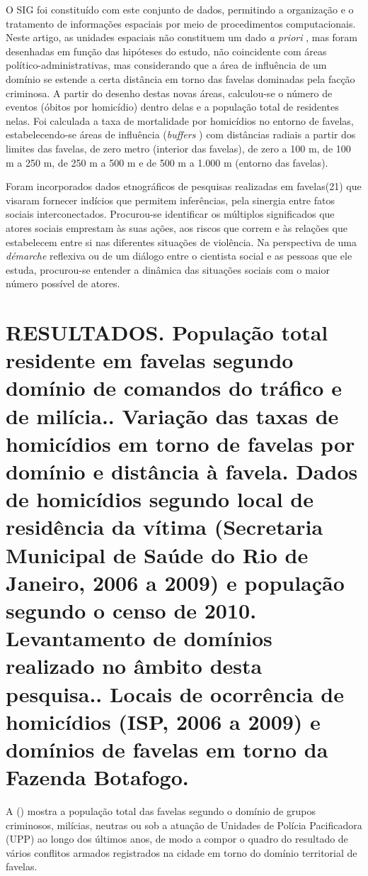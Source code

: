 \documentclass{article}
\begin{document}
O SIG foi constituído com este conjunto de dados, permitindo a organização e o
tratamento de informações espaciais por meio de procedimentos computacionais.
Neste artigo, as unidades espaciais não constituem um dado \textit{a priori}
, mas foram desenhadas em função das hipóteses do estudo, não coincidente com
áreas político-administrativas, mas considerando que a área de influência de um
domínio se estende a certa distância em torno das favelas dominadas pela facção
criminosa. A partir do desenho destas novas áreas, calculou-se o número de
eventos (óbitos por homicídio) dentro delas e a população total de residentes
nelas. Foi calculada a taxa de mortalidade por homicídios no entorno de favelas,
estabelecendo-se áreas de influência (\textit{buffers}
) com distâncias radiais a partir dos limites das favelas, de zero metro
(interior das favelas), de zero a 100 m, de 100 m a 250 m, de 250 m a 500 m e de
500 m a 1.000 m (entorno das favelas).

Foram incorporados dados etnográficos de pesquisas realizadas em favelas(21)
que visaram fornecer indícios que permitem inferências, pela sinergia entre
fatos sociais interconectados. Procurou-se identificar os múltiplos significados
que atores sociais emprestam às suas ações, aos riscos que correm e às relações
que estabelecem entre si nas diferentes situações de violência. Na perspectiva
de uma \textit{démarche}
reflexiva ou de um diálogo entre o cientista social e as pessoas que ele estuda,
procurou-se entender a dinâmica das situações sociais com o maior número
possível de atores.

\section{RESULTADOS. População total residente em favelas segundo domínio de
comandos do tráfico e de milícia.. Variação das taxas de homicídios em torno de
favelas por domínio e distância à favela. Dados de homicídios segundo local de
residência da vítima (Secretaria Municipal de Saúde do Rio de Janeiro, 2006 a
2009) e população segundo o censo de 2010. Levantamento de domínios realizado no
âmbito desta pesquisa.. Locais de ocorrência de homicídios (ISP, 2006 a 2009) e
domínios de favelas em torno da Fazenda Botafogo.}

A ()
mostra a população total das favelas segundo o domínio de grupos criminosos,
milícias, neutras ou sob a atuação de Unidades de Polícia Pacificadora (UPP) ao
longo dos últimos anos, de modo a compor o quadro do resultado de vários
conflitos armados registrados na cidade em torno do domínio territorial de
favelas.
\end{document}
